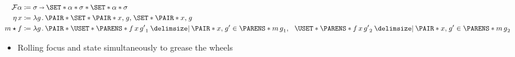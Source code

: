 \documentclass[10pt,fleqn]{article}
\begin{document}
\dotbreak

\begin{minipage}[t]{0.5\textwidth} %
\begin{spreadlines}{0pt}
\begin{align*}
  \mathcal{F}\alpha
  &\coloneq
  \sigma \sto \typepair{%
    \set{\typepair{\alpha}{\sigma}}
  }{%
    \set{\typepair{\alpha}{\sigma}}
  } \\
  \eta\,x
  &\coloneq
  \l g \dt \pair{\set{\pair{x}{g}}}{\set{\pair{x}{g}}} \\
  m \bind f
  &\coloneq
  \l g \dt
    \thickpair{%
      \uset{\p{f\,x\,g'}_1 \giv \pair{x}{g'} \in \p{m\,g}_1}
    }{%
      \uset{\p{f\,x\,g'}_2 \giv \pair{x}{g'} \in \p{m\,g}_2}
    }
\end{align*}
\end{spreadlines}
\end{minipage}
%
%
\begin{minipage}[t]{0.5\textwidth} %
\begin{itemize}
  \item
    Rolling focus and state simultaneously to grease the wheels
\end{itemize}
\end{minipage}

\dotbreak
\end{document}
